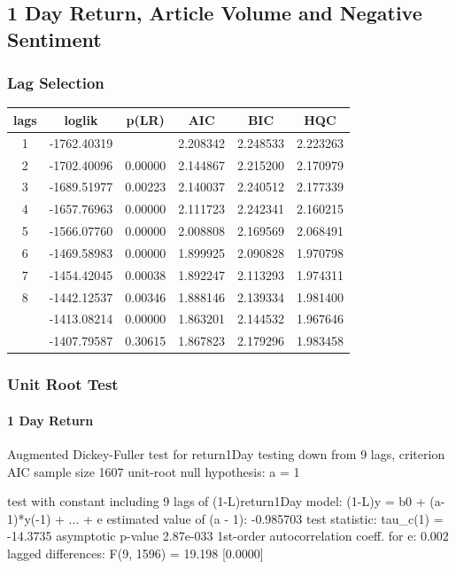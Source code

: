 \subsection{1 Day Return, Article Volume and Negative Sentiment}

\subsubsection{Lag Selection}

\begin{center}
\begin{tabular}{ c c c c c c }
lags & loglik & p(LR) & AIC & BIC & HQC \\
\hline
1 & -1762.40319 & & 2.208342 & 2.248533 & 2.223263 \\
2 & -1702.40096 & 0.00000 & 2.144867 & 2.215200 & 2.170979 \\
3 & -1689.51977 & 0.00223 & 2.140037 & 2.240512 & 2.177339 \\
4 & -1657.76963 & 0.00000 & 2.111723 & 2.242341 & 2.160215 \\
5 & -1566.07760 & 0.00000 & 2.008808 & 2.169569 & 2.068491 \\
6 & -1469.58983 & 0.00000 & 1.899925 & 2.090828 & 1.970798 \\
7 & -1454.42045 & 0.00038 & 1.892247 & 2.113293 & 1.974311 \\
8 & -1442.12537 & 0.00346 & 1.888146 & 2.139334 & 1.981400 \\
\arrayrulecolor{red}\hline
9 & -1413.08214 & 0.00000 & 1.863201 & 2.144532 & 1.967646 \\
\arrayrulecolor{red}\hline
10 & -1407.79587 & 0.30615 & 1.867823 & 2.179296 & 1.983458 \\
\end{tabular}
\end{center}

\subsubsection{Unit Root Test}

\paragraph{1 Day Return}

Augmented Dickey-Fuller test for return1Day
testing down from 9 lags, criterion AIC
sample size 1607
unit-root null hypothesis: a = 1

test with constant 
including 9 lags of (1-L)return1Day
model: (1-L)y = b0 + (a-1)*y(-1) + ... + e
estimated value of (a - 1): -0.985703
test statistic: tau\_c(1) = -14.3735
asymptotic p-value 2.87e-033
1st-order autocorrelation coeff. for e: 0.002
lagged differences: F(9, 1596) = 19.198 [0.0000]

